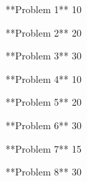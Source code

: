 **Problem 1**
10

**Problem 2**
20

**Problem 3**
30

**Problem 4**
10

**Problem 5**
20

**Problem 6**
30

**Problem 7**
15

**Problem 8**
30

